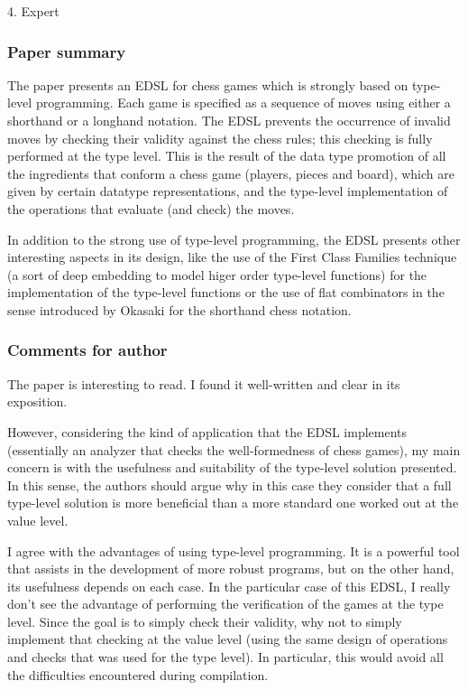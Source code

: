 4. Expert

\subsubsection{Paper summary}

The paper presents an EDSL for chess games which is strongly based on type-level programming. Each game is specified as a sequence of moves using either a shorthand or a longhand notation. The EDSL prevents the occurrence of invalid moves by checking their validity against the chess rules; this checking is fully performed at the type level. This is the result of the data type promotion of all the ingredients that conform a chess game (players, pieces and board), which are given by certain datatype representations, and the type-level implementation of the operations that evaluate (and check) the moves.

In addition to the strong use of type-level programming, the EDSL presents other interesting aspects in its design, like the use of the First Class Families technique (a sort of deep embedding to model higer order type-level functions) for the implementation of the type-level functions or the use of flat combinators in the sense introduced by Okasaki for the shorthand chess notation.

\subsubsection{Comments for author}

The paper is interesting to read. I found it well-written and clear in its exposition.

However, considering the kind of application that the EDSL implements (essentially an analyzer that checks the well-formedness of chess games), my main concern is with the usefulness and suitability of the type-level solution presented. In this sense, the authors should argue why in this case they consider that a full type-level solution is more beneficial than a more standard one worked out at the value level.

I agree with the advantages of using type-level programming. It is a powerful tool that assists in the development of more robust programs, but on the other hand, its usefulness depends on each case. In the particular case of this EDSL, I really don't see the advantage of performing the verification of the games at the type level. Since the goal is to simply check their validity, why not to simply implement that checking at the value level (using the same design of operations and checks that was used for the type level). In particular, this would avoid all the difficulties encountered during compilation.

